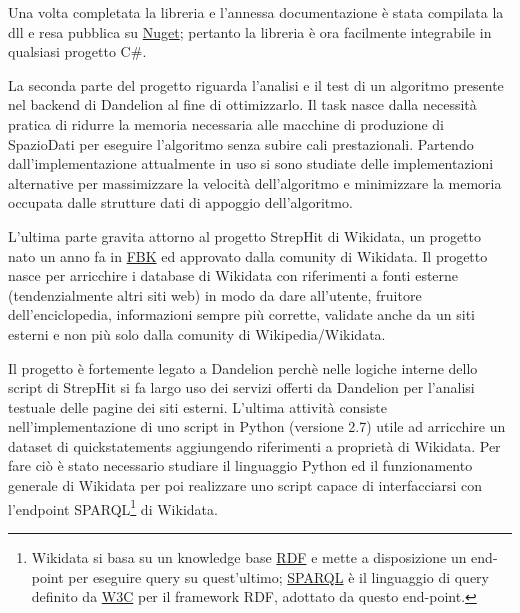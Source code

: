 Una volta completata la libreria e l'annessa documentazione è stata compilata la dll e resa pubblica su \href{https://www.nuget.org/}{Nuget}; 
pertanto la libreria è ora facilmente integrabile in qualsiasi progetto C$\#$.

La seconda parte del progetto riguarda l'analisi e il test di un algoritmo presente nel backend di Dandelion al fine di ottimizzarlo. 
Il task nasce dalla necessità pratica di ridurre la memoria necessaria alle macchine di produzione di SpazioDati per eseguire l'algoritmo senza subire cali prestazionali.
Partendo dall'implementazione attualmente in uso si sono studiate delle implementazioni alternative per massimizzare la velocità dell'algoritmo e minimizzare 
la memoria occupata dalle strutture dati di appoggio dell'algoritmo. 

L'ultima parte gravita attorno al progetto StrepHit di Wikidata, un progetto nato un anno fa in \href{https://www.fbk.eu/it/}{FBK} ed approvato dalla comunity di Wikidata. 
Il progetto nasce per arricchire i database di Wikidata con riferimenti a fonti esterne (tendenzialmente altri siti web) in modo da dare all'utente, fruitore dell'enciclopedia, informazioni sempre più corrette,
validate anche da un siti esterni e non più solo dalla comunity di Wikipedia/Wikidata.

Il progetto è fortemente legato a Dandelion perchè nelle logiche interne dello script di StrepHit si fa largo uso dei servizi offerti da Dandelion per l'analisi testuale delle pagine dei siti esterni.
L'ultima attività consiste nell'implementazione di uno script in Python (versione 2.7) utile ad arricchire un dataset di quickstatements aggiungendo riferimenti a proprietà di Wikidata.
Per fare ciò è stato necessario studiare il linguaggio Python ed il funzionamento generale di Wikidata per poi realizzare uno script capace di interfacciarsi con l'endpoint SPARQL\footnote{
    Wikidata si basa su un knowledge base \href{https://www.w3.org/RDF/}{RDF} e mette a disposizione un end-point per eseguire query su quest'ultimo; \href{https://www.w3.org/TR/rdf-sparql-query/}{SPARQL} 
    è il linguaggio di query definito da \href{https://www.w3.org/}{W3C} per il framework RDF, adottato da questo end-point.
} di Wikidata.
